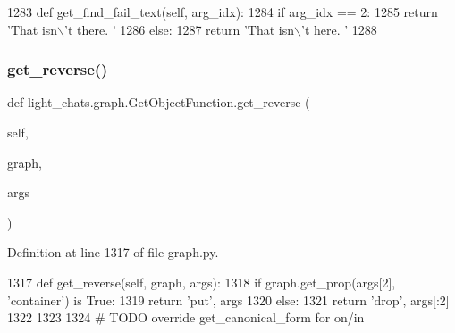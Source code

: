 \begin{DoxyCode}
1283     \textcolor{keyword}{def }get\_find\_fail\_text(self, arg\_idx):
1284         \textcolor{keywordflow}{if} arg\_idx == 2:
1285             \textcolor{keywordflow}{return} \textcolor{stringliteral}{'That isn\(\backslash\)'t there. '}
1286         \textcolor{keywordflow}{else}:
1287             \textcolor{keywordflow}{return} \textcolor{stringliteral}{'That isn\(\backslash\)'t here. '}
1288 
\end{DoxyCode}
\mbox{\label{classlight__chats_1_1graph_1_1GetObjectFunction_abf058d18fba80c7d17fc0d3ce8edbc72}} 
\subsubsection{\texorpdfstring{get\+\_\+reverse()}{get\_reverse()}}
{\footnotesize\ttfamily def light\+\_\+chats.\+graph.\+Get\+Object\+Function.\+get\+\_\+reverse (\begin{DoxyParamCaption}\item[{}]{self,  }\item[{}]{graph,  }\item[{}]{args }\end{DoxyParamCaption})}



Definition at line 1317 of file graph.\+py.


\begin{DoxyCode}
1317     \textcolor{keyword}{def }get\_reverse(self, graph, args):
1318         \textcolor{keywordflow}{if} graph.get\_prop(args[2], \textcolor{stringliteral}{'container'}) \textcolor{keywordflow}{is} \textcolor{keyword}{True}:
1319             \textcolor{keywordflow}{return} \textcolor{stringliteral}{'put'}, args
1320         \textcolor{keywordflow}{else}:
1321             \textcolor{keywordflow}{return} \textcolor{stringliteral}{'drop'}, args[:2]
1322 
1323 
1324 \textcolor{comment}{# TODO override get\_canonical\_form for on/in}
\end{DoxyCode}
\mbox{\label{classlight__chats_1_1graph_1_1GetObjectFunction_a2854af16c5150dcd6a39176fefc3d536}} 
